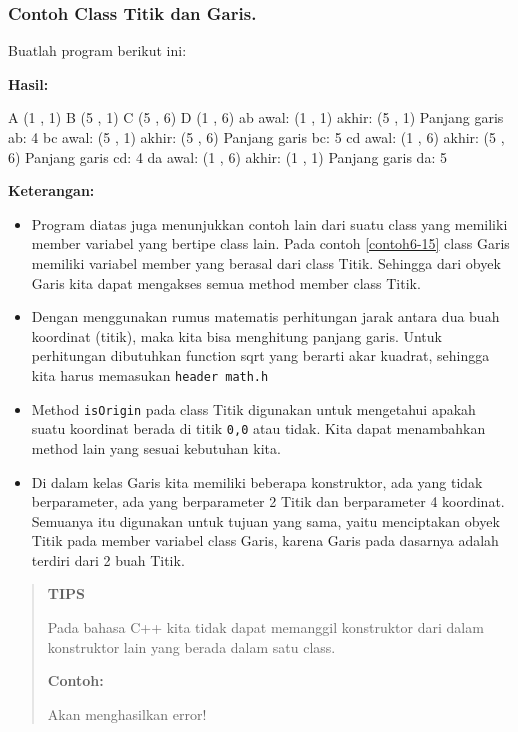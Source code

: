 \subsubsection*{Contoh Class Titik dan Garis.}

Buatlah program berikut ini:



\textbf{Hasil:}

\begin{lcverbatim}
A (1 , 1)
B (5 , 1)
C (5 , 6)
D (1 , 6)
ab awal: (1 , 1)
akhir: (5 , 1)
Panjang garis ab: 4
bc awal: (5 , 1)
akhir: (5 , 6)
Panjang garis bc: 5
cd awal: (1 , 6)
akhir: (5 , 6)
Panjang garis cd: 4
da awal: (1 , 6)
akhir: (1 , 1)
Panjang garis da: 5
\end{lcverbatim}

\textbf{Keterangan:}

\begin{itemize}

\item
 Program diatas juga menunjukkan contoh lain dari suatu class yang
 memiliki member variabel yang bertipe class lain. Pada contoh \ref{contoh6-15}
 class Garis memiliki variabel member yang berasal dari class Titik.
 Sehingga dari obyek Garis kita dapat mengakses semua method member
 class Titik.
\item
 Dengan menggunakan rumus matematis perhitungan jarak antara dua buah
 koordinat (titik), maka kita bisa menghitung panjang garis. Untuk
 perhitungan dibutuhkan function sqrt yang berarti akar kuadrat,
 sehingga kita harus memasukan \texttt{header\ math.h}
\item
 Method \texttt{isOrigin} pada class Titik digunakan untuk mengetahui
 apakah suatu koordinat berada di titik \texttt{0,0} atau tidak. Kita
 dapat menambahkan method lain yang sesuai kebutuhan kita.
\item
 Di dalam kelas Garis kita memiliki beberapa konstruktor, ada yang
 tidak berparameter, ada yang berparameter 2 Titik dan berparameter 4
 koordinat. Semuanya itu digunakan untuk tujuan yang sama, yaitu
 menciptakan obyek Titik pada member variabel class Garis, karena Garis
 pada dasarnya adalah terdiri dari 2 buah Titik.
\end{itemize}

\begin{quotation}
{\LARGE {}} \textbf{TIPS}

Pada bahasa C++ kita tidak dapat memanggil konstruktor dari dalam konstruktor
lain yang berada dalam satu class.

\textbf{Contoh:}



 Akan menghasilkan error!
\end{quotation}

